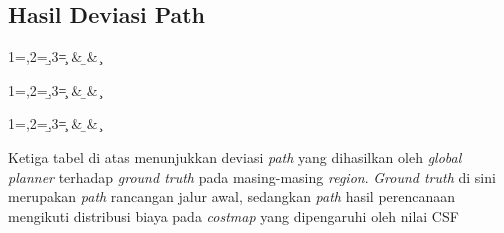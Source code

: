 \subsection{Hasil Deviasi Path}

\begin{table}[H]
\centering
{}
  {1=\a,2=\b,3=\c}
  {\a & \b & \c}
\caption{Perbandingan path terhadap ground truth di region A}
\label{tab:path_comparison_ra}
\end{table}

\begin{table}[H]
\centering
{}
  {1=\a,2=\b,3=\c}
  {\a & \b & \c}
\caption{Perbandingan path terhadap ground truth di region B}
\label{tab:path_comparison_rb}
\end{table}

\begin{table}[H]
\centering
{}
  {1=\a,2=\b,3=\c}
  {\a & \b & \c}
\caption{Perbandingan path terhadap ground truth di region C}
\label{tab:path_comparison_rc}
\end{table}

Ketiga tabel di atas menunjukkan deviasi \emph{path} yang dihasilkan oleh \emph{global planner}
terhadap \emph{ground truth} pada masing-masing \emph{region}. \emph{Ground truth}
di sini merupakan \emph{path} rancangan jalur awal, sedangkan \emph{path} hasil
perencanaan mengikuti distribusi biaya pada \emph{costmap} yang dipengaruhi
oleh nilai CSF

